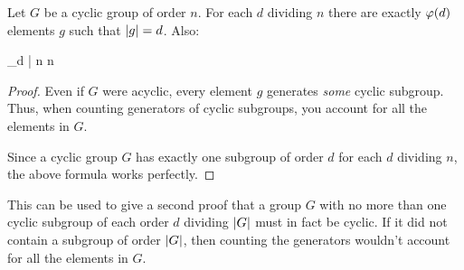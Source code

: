 \begin{corollary}
  Let $G$ be a cyclic group of order $n$. For each $d$ dividing $n$
  there are exactly $\varphi\mathopen{}\left( {d} \right)\mathclose{}$ elements $g$ such that $|g| = d$.
  Also:

  \begin{nedqn}
    \sum_{d | n} 
  \eqcol
    n
  \end{nedqn}
\end{corollary}

\begin{proof}
  Even if $G$ were acyclic, every element $g$ generates \emph{some}
  cyclic subgroup. Thus, when counting generators of cyclic subgroups,
  you account for all the elements in $G$.

  Since a cyclic group $G$ has exactly one subgroup of order $d$
  for each $d$ dividing $n$, the above formula works perfectly.
\end{proof}

\begin{remark}
  This can be used to give a second proof that a group $G$ with no more
  than one cyclic subgroup of each order $d$ dividing $|G|$ must
  in fact be cyclic. If it did not contain a subgroup of order
  $|G|$, then counting the generators wouldn't account for all the
  elements in $G$.
\end{remark}
